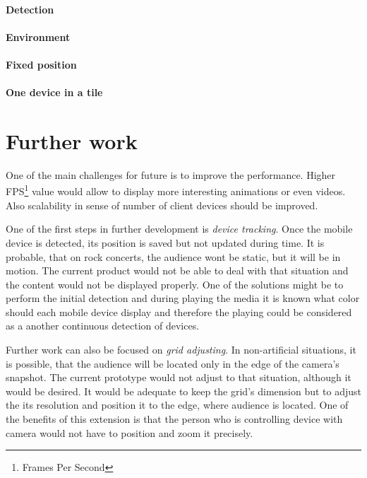 \paragraph{Detection}

\paragraph{Environment}

\paragraph{Fixed position}

\paragraph{One device in a tile}

\section{Further work}
One of the main challenges for future is to improve the performance.
Higher FPS\footnote{Frames Per Second} value would allow to display more interesting animations or even videos.
Also scalability in sense of number of client devices should be improved.

One of the first steps in further development is \emph{device tracking}.
Once the mobile device is detected, its position is saved but not updated during time.
It is probable, that on rock concerts, the audience wont be static, but it will be in motion.
The current product would not be able to deal with that situation and the content would not be displayed properly.
One of the solutions might be to perform the initial detection and during playing the media it is known what color should each mobile device display and therefore the playing could be considered as a another continuous detection of devices.

Further work can also be focused on \emph{grid adjusting}.
In non-artificial situations, it is possible, that the audience will be located only in the edge of the camera's snapshot.
The current prototype would not adjust to that situation, although it would be desired.
It would be adequate to keep the grid's dimension but to adjust the its resolution and position it to the edge, where audience is located.
One of the benefits of this extension is that the person who is controlling device with camera would not have to position and zoom it precisely.

